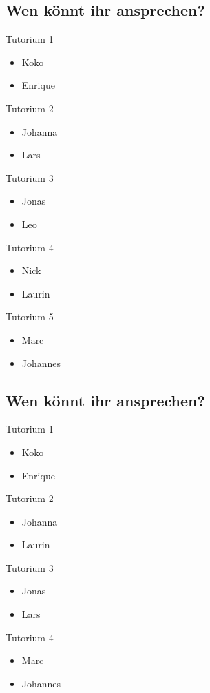 \documentclass[
	aspectratio=169, %
	11pt %
]{beamer}
\begin{document}
\subsection{Wen könnt ihr ansprechen?}
\begin{frame}{\insertsubsection}
	\begin{fancycolumns}[columns=3]
		Tutorium 1
		\begin{itemize}
			\item Koko
			\item Enrique
		\end{itemize}
		Tutorium 2
		\begin{itemize}
			\item Johanna
			\item Lars
		\end{itemize}
		\nextcolumn
		Tutorium 3
		\begin{itemize}
			\item Jonas
			\item Leo
		\end{itemize}
		Tutorium 4
		\begin{itemize}
			\item Nick
			\item Laurin
		\end{itemize}
		\nextcolumn
		Tutorium 5
		\begin{itemize}
			\item Marc
			\item Johannes
		\end{itemize}
	\end{fancycolumns}
\end{frame}

\subsection{Wen könnt ihr ansprechen?}
\begin{frame}{\insertsubsection}
	\begin{fancycolumns}[columns=2]
		Tutorium 1
		\begin{itemize}
			\item Koko
			\item Enrique
		\end{itemize}
		Tutorium 2
		\begin{itemize}
			\item Johanna
			\item Laurin
		\end{itemize}
		\nextcolumn
		Tutorium 3
		\begin{itemize}
			\item Jonas
			\item Lars
		\end{itemize}
		Tutorium 4
		\begin{itemize}
			\item Marc
			\item Johannes
		\end{itemize}
	\end{fancycolumns}
\end{frame}
\end{document}

